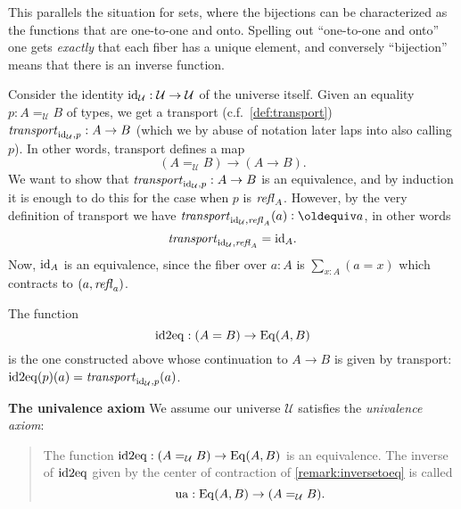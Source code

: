 \begin{definition}
\begin{remark}
This parallels the situation for sets, where the bijections can be characterized as the functions that are one-to-one and onto.  Spelling out ``one-to-one and onto'' one gets \emph{exactly} that each fiber has a unique element, and conversely ``bijection'' means that there is an inverse function.
\end{remark}


Consider the identity $\mathord{\mathrm{id}}_{\mathcal U}:\mathcal U\to\mathcal U$ of the universe itself.  Given an equality $p:A=_{\mathcal U}B$ of types, we get a transport (c.f.~\cref{def:transport}) $\mathord{\mathit{transport}}_{\mathord{\mathrm{id}}_{\mathcal U},p}:A\to B$ (which we by abuse of notation later laps into also calling $p$).  In other words, transport defines a map 
$$(A=_{\mathcal U}B)\to (A\to B).$$
We want to show that $\mathord{\mathit{transport}}_{\mathord{\mathrm{id}}_{\mathcal U},p}:A\to B$ is an equivalence, and by induction it is enough to do this for the case when $p$ is $\mathop{{\it refl}_{A}}$.  However, by the very definition of transport we have 
$\trp_{\id_{\mathcal U},\refl A}(a)\defequi a$, in other words 
$$\mathord{\mathit{transport}}_{\mathord{\mathrm{id}}_{\mathcal U},\mathop{{\it refl}_{A}}}=\mathord{\mathrm{id}}_A.$$
Now, $\mathord{\mathrm{id}}_A$ is an equivalence, since the fiber over $a:A$ is $\sum_{x:A}(a=x)$ which contracts to $(a,\mathop{{\it refl}_{a}})$.
\begin{definition}\label{lem:idtoequiv}
  The function 
$$\mathrm{id2eq}:(A=B)\to\mathrm{Eq}(A,B)$$ is the one constructed above whose continuation to $A\to B$ is given by transport: $\mathrm{id2eq}(p)(a)=\mathord{\mathit{transport}}_{\mathord{\mathrm{id}}_{\mathcal U},p}(a)$.
\end{definition}

{\bf The univalence axiom}
We assume our universe $\mathcal U$ satisfies the \emph{univalence axiom}:
\begin{quote}
  The function $\mathrm{id2eq}:(A=_{\mathcal U}B)\to\mathrm{Eq}(A,B)$ is an equivalence.  The  inverse of $\mathrm{id2eq}$ given by the center of contraction of \cref{remark:inversetoeq} is called 
$$\mathrm{ua}:\mathrm{Eq}(A,B)\to (A=_{\mathcal U}B).$$
\end{quote}




\end{definition}
